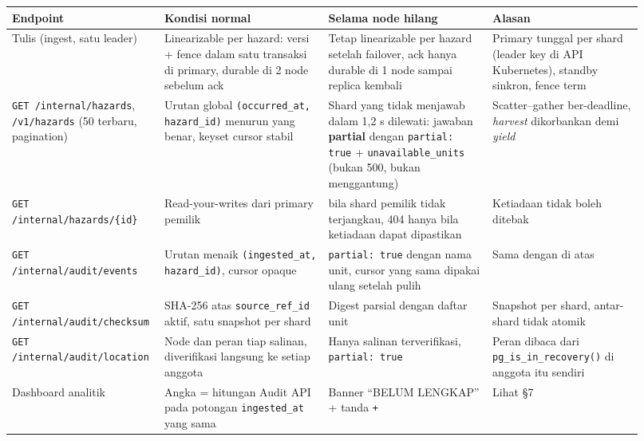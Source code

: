 {\small
\begin{longtable}{@{}>{\raggedright\arraybackslash}p{0.174\linewidth}>{\raggedright\arraybackslash}p{0.254\linewidth}>{\raggedright\arraybackslash}p{0.254\linewidth}>{\raggedright\arraybackslash}p{0.239\linewidth}@{}}
\toprule
\textbf{Endpoint} & \textbf{Kondisi normal} & \textbf{Selama node hilang} & \textbf{Alasan} \\
\midrule
\endhead
Tulis (ingest, satu leader) & Linearizable per hazard: versi + fence dalam satu transaksi di primary, durable di 2 node sebelum ack & Tetap linearizable per hazard setelah failover, ack hanya durable di 1 node sampai replica kembali & Primary tunggal per shard (leader key di API Kubernetes), standby sinkron, fence term \\
\texttt{GET /\allowbreak{}internal/\allowbreak{}hazards}, \texttt{/\allowbreak{}v1/\allowbreak{}hazards} (50 terbaru, pagination) & Urutan global \texttt{(occurred\_\allowbreak{}at,\allowbreak{} hazard\_\allowbreak{}id)} menurun yang benar, keyset cursor stabil & Shard yang tidak menjawab dalam 1,2 s dilewati: jawaban \textbf{partial} dengan \texttt{partial: true} + \texttt{unavailable\_\allowbreak{}units} (bukan 500, bukan menggantung) & Scatter--gather ber-deadline, \emph{harvest} dikorbankan demi \emph{yield} \\
\texttt{GET /\allowbreak{}internal/\allowbreak{}hazards/\allowbreak{}\{id\}} & Read-your-writes dari primary pemilik & 503 bila shard pemilik tidak terjangkau, 404 hanya bila ketiadaan dapat dipastikan & Ketiadaan tidak boleh ditebak \\
\texttt{GET /\allowbreak{}internal/\allowbreak{}audit/\allowbreak{}events} & Urutan menaik \texttt{(ingested\_\allowbreak{}at,\allowbreak{} hazard\_\allowbreak{}id)}, cursor opaque & \texttt{partial: true} dengan nama unit, cursor yang sama dipakai ulang setelah pulih & Sama dengan di atas \\
\texttt{GET /\allowbreak{}internal/\allowbreak{}audit/\allowbreak{}checksum} & SHA-256 atas \texttt{source\_\allowbreak{}ref\_\allowbreak{}id} aktif, satu snapshot per shard & Digest parsial dengan daftar unit & Snapshot per shard, antar-shard tidak atomik \\
\texttt{GET /\allowbreak{}internal/\allowbreak{}audit/\allowbreak{}location} & Node dan peran tiap salinan, diverifikasi langsung ke setiap anggota & Hanya salinan terverifikasi, \texttt{partial: true} & Peran dibaca dari \texttt{pg\_\allowbreak{}is\_\allowbreak{}in\_\allowbreak{}recovery()} di anggota itu sendiri \\
Dashboard analitik & Angka = hitungan Audit API pada potongan \texttt{ingested\_\allowbreak{}at} yang sama & Banner ``BELUM LENGKAP'' + tanda \texttt{+} & Lihat §7 \\
\bottomrule
\end{longtable}
}

